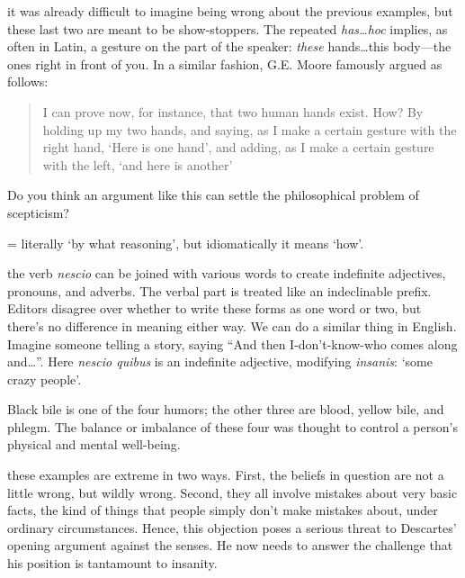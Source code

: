  it was already difficult to imagine being wrong about the previous examples, but these last two are meant to be show-stoppers. The repeated \textit{has\dots hoc} implies, as often in Latin, a gesture on the part of the speaker: \textit{these} hands\dots this body---the ones right in front of you. In a similar fashion, G.E. Moore \citep[165--166]{baldwin1993} famously argued as follows:
\begin{quote}
    I can prove now, for instance, that two human hands exist. How? By holding up my two hands, and saying, as I make a certain gesture with the right hand, `Here is one hand', and adding, as I make a certain gesture with the left, `and here is another'
\end{quote}
Do you think an argument like this can settle the philosophical problem of scepticism?

 = literally `by what reasoning', but idiomatically it means `how'.

 the verb \textit{nescio} can be joined with various words to create indefinite adjectives, pronouns, and adverbs. The verbal part is treated like an indeclinable prefix. Editors disagree over whether to write these forms as one word or two, but there's no difference in meaning either way. We can do a similar thing in English. Imagine someone telling a story, saying ``And then I-don't-know-who comes along and\dots''. Here \textit{nescio quibus} is an indefinite adjective, modifying \textit{insanis}: `some crazy people'.

 Black bile is one of the four humors; the other three are blood, yellow bile, and phlegm. The balance or imbalance of these four was thought to control a person's physical and mental well-being.

 these examples are extreme in two ways. First, the beliefs in question are not a little wrong, but wildly wrong. Second, they all involve mistakes about very basic facts, the kind of things that people simply don't make mistakes about, under ordinary circumstances. Hence, this objection poses a serious threat to Descartes' opening argument against the senses. He now needs to answer the challenge that his position is tantamount to insanity.


